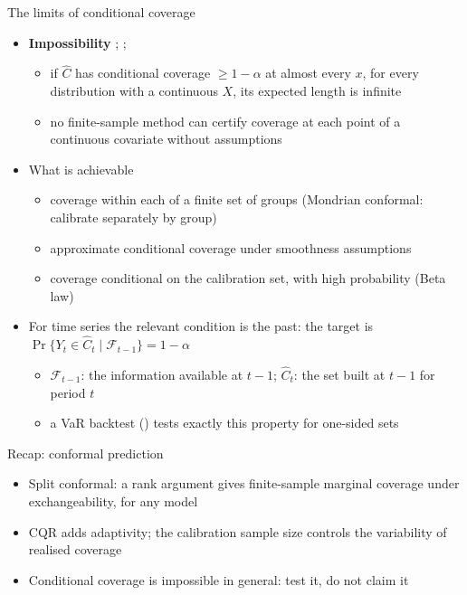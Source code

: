 \begin{frame}{The limits of conditional coverage}
\itemsize{\small}
\begin{itemize}
    \item \textbf{Impossibility} ; ; 
    \begin{itemize}
        \item if $\hat C$ has conditional coverage $\ge 1 - \alpha$ at almost every $x$, for every distribution with a continuous $X$, its expected length is infinite
        \item no finite-sample method can certify coverage at each point of a continuous covariate without assumptions
    \end{itemize}
    \item What is achievable
    \begin{itemize}
        \item coverage within each of a finite set of groups (Mondrian conformal: calibrate separately by group)
        \item approximate conditional coverage under smoothness assumptions
        \item coverage conditional on the calibration set, with high probability (Beta law)
    \end{itemize}
    \item For time series the relevant condition is the past: the target is $\Pr\{Y_t \in \hat C_t \mid \mathcal F_{t-1}\} = 1 - \alpha$
    \begin{itemize}
        \item $\mathcal F_{t-1}$: the information available at $t - 1$; $\hat C_t$: the set built at $t - 1$ for period $t$
        \item a VaR backtest () tests exactly this property for one-sided sets
    \end{itemize}
\end{itemize}
\end{frame}

\begin{frame}{Recap: conformal prediction}
\itemsize{\small}
\begin{itemize}
    \item Split conformal: a rank argument gives finite-sample marginal coverage under exchangeability, for any model
    \item CQR adds adaptivity; the calibration sample size controls the variability of realised coverage
    \item Conditional coverage is impossible in general: test it, do not claim it
\end{itemize}
\end{frame}


